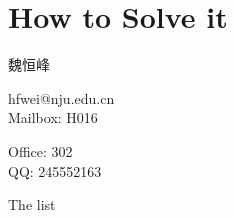 \section{How to Solve it}

\begin{frame}
  \begin{center}
    魏恒峰

    hfwei@nju.edu.cn \\[10pt]

    Mailbox: H016

    Office: 302  \\[10pt]

    QQ: 245552163
  \end{center}
\end{frame}

\begin{frame}{The list}
\end{frame}
